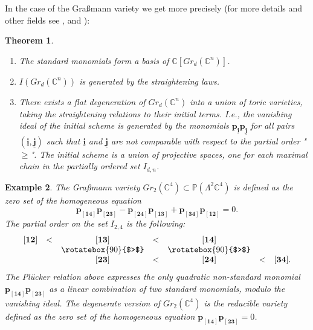 \documentclass{emsprocart}
\newtheorem{theorem}{Theorem}[section]
\newtheorem{exam}[theorem]{Example}
\theoremstyle{definition}
\begin{document}
In the case of the Gra\ss mann variety we get more precisely (for more details and other fields see \cite{BL},  \cite{DEP} and \cite{S}):
\begin{theorem}\label{grassmanncase}
\begin{enumerate}
\item[{\it i)}] The standard monomials form a basis of $\mathbb C[Gr_{d}(\mathbb C^n)]$.
\item[{\it ii)}] $I(Gr_{d}(\mathbb C^n))$ is generated by the straightening laws.
\item[{\it iii)}] There exists a flat degeneration of $Gr_{d}(\mathbb C^n)$ into a union of toric varieties,
taking the straightening relations to their initial terms. I.e., the vanishing ideal
of the initial scheme is generated by the monomials $\mathbf p_{\underline{\mathbf i}}\mathbf p_{\underline{\mathbf j}}$
for all pairs $(\underline{\mathbf i}, \underline{\mathbf j})$ such that $\underline{\mathbf i}$ and $\underline{\mathbf j}$
are not comparable with respect to the partial order "$\ge$". The initial scheme is a union of projective spaces,
one for each maximal chain in the partially ordered set $I_{d,n}$.
\end{enumerate}
\end{theorem}
\par\noindent
\begin{exam}\rm
The Gra\ss mann variety $Gr_{2}(\mathbb C^4)\subset \mathbb P(\Lambda^2\mathbb C^4)$ is defined as the zero set
of the homogeneous equation
$$
\mathbf p_{\mathbf{[14]}} \mathbf p_\mathbf{[23]} -
\mathbf p_{\mathbf{[24]}}\mathbf p_{\mathbf{[13]}}+
\mathbf p_{\mathbf{[34]}}\mathbf p_{\mathbf{[12]}}=0.
$$
The partial order on the set $I_{2,4}$ is the following:
$$
\begin{array}{ccccccc}
\mathbf{[12]}&<& \mathbf{[13]}&<& \mathbf{[14]}\\
                     &  &     \rotatebox{90}{$>$}   &&   \rotatebox{90}{$>$} \\
                     &   & \mathbf{[23]}&<&\mathbf{[24]}&<&\mathbf{[34]}.
\end{array}
$$
The Pl\"ucker relation above expresses the only quadratic non-standard monomial $\mathbf p_{\mathbf{[14]}} \mathbf p_\mathbf{[23]}$
as a linear combination of two standard monomials, modulo the vanishing ideal.
The degenerate version of $Gr_{2}(\mathbb C^4)$ is the reducible variety defined as the zero set of the homogeneous equation
$\mathbf p_{\mathbf{[14]}} \mathbf p_\mathbf{[23]}=0$.
\end{exam}
\end{document}
